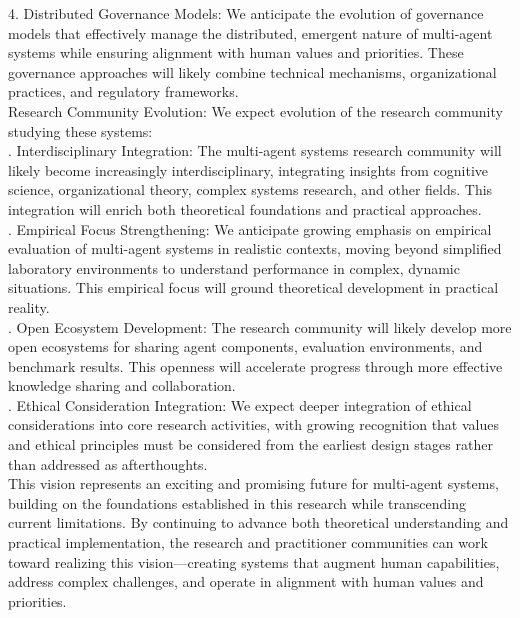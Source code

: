 4. Distributed Governance Models: We anticipate the evolution of governance models that effectively manage the distributed, emergent nature of multi-agent systems while ensuring alignment with human values and priorities. These governance approaches will likely combine technical mechanisms, organizational practices, and regulatory frameworks.\\ \newline
Research Community Evolution: We expect evolution of the research community studying these systems:\\ . Interdisciplinary Integration: The multi-agent systems research community will likely become increasingly interdisciplinary, integrating insights from cognitive science, organizational theory, complex systems research, and other fields. This integration will enrich both theoretical foundations and practical approaches.\\ . Empirical Focus Strengthening: We anticipate growing emphasis on empirical evaluation of multi-agent systems in realistic contexts, moving beyond simplified laboratory environments to understand performance in complex, dynamic situations. This empirical focus will ground theoretical development in practical reality.\\ . Open Ecosystem Development: The research community will likely develop more open ecosystems for sharing agent components, evaluation environments, and benchmark results. This openness will accelerate progress through more effective knowledge sharing and collaboration.\\ . Ethical Consideration Integration: We expect deeper integration of ethical considerations into core research activities, with growing recognition that values and ethical principles must be considered from the earliest design stages rather than addressed as afterthoughts.\\ \newline
This vision represents an exciting and promising future for multi-agent systems, building on the foundations established in this research while transcending current limitations. By continuing to advance both theoretical understanding and practical implementation, the research and practitioner communities can work toward realizing this vision—creating systems that augment human capabilities, address complex challenges, and operate in alignment with human values and priorities.\\
